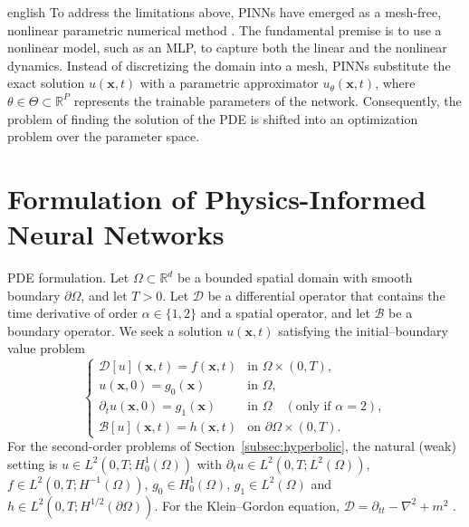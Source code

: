 \documentclass[../0000.tex]{subfiles}
\begin{document}
\begin{hyphenrules}{english}
To address the limitations above, PINNs have emerged as a mesh-free, nonlinear parametric numerical
method \cite{raissi2019}. The fundamental premise is to use a nonlinear model, such as an MLP, to
capture both the linear and the nonlinear dynamics. Instead of discretizing the domain into a mesh,
PINNs substitute the exact solution $u(\mathbf{x},t)$ with a parametric approximator $u_\theta(\mathbf{x},t)$, where
$\theta\in\Theta\subset\mathbb{R}^{P}$ represents the trainable parameters of the network. Consequently, the
problem of finding the solution of the PDE is shifted into an optimization problem over the parameter
space.

\section{Formulation of Physics-Informed Neural Networks}\label{sec:pinn-formulation}

\begin{definicion}{PDE formulation.}\label{def:pde-formulation}
Let $\Omega\subset\mathbb{R}^d$ be a bounded spatial domain with smooth boundary $\partial\Omega$, and let
$T>0$. Let $\mathcal{D}$ be a differential operator that contains the time derivative of order
$\alpha\in\{1,2\}$ and a spatial operator, and let $\mathcal{B}$ be a boundary operator. We seek a
solution $u(\mathbf{x},t)$ satisfying the initial--boundary value problem
\[
  \begin{cases}
    \mathcal{D}[u](\mathbf{x},t)=f(\mathbf{x},t) & \text{in } \Omega\times(0,T),\\
    u(\mathbf{x},0)=g_0(\mathbf{x}) & \text{in } \Omega,\\
    \partial_t u(\mathbf{x},0)=g_1(\mathbf{x}) & \text{in } \Omega\quad(\text{only if }\alpha=2),\\
    \mathcal{B}[u](\mathbf{x},t)=h(\mathbf{x},t) & \text{on } \partial\Omega\times(0,T).
  \end{cases}
\]
For the second-order problems of Section~\ref{subsec:hyperbolic}, the natural (weak) setting is
$u\in L^2(0,T;H^1_0(\Omega))$ with $\partial_t u\in L^2(0,T;L^2(\Omega))$, $f\in L^2(0,T;H^{-1}(\Omega))$,
$g_0\in H^1_0(\Omega)$, $g_1\in L^2(\Omega)$ and $h\in L^2(0,T;H^{1/2}(\partial\Omega))$. For the
Klein--Gordon equation, $\mathcal{D}=\partial_{tt}-\nabla^2+m^2$ \cite{qian2023}.
\end{definicion}


\end{hyphenrules}
\end{document}
